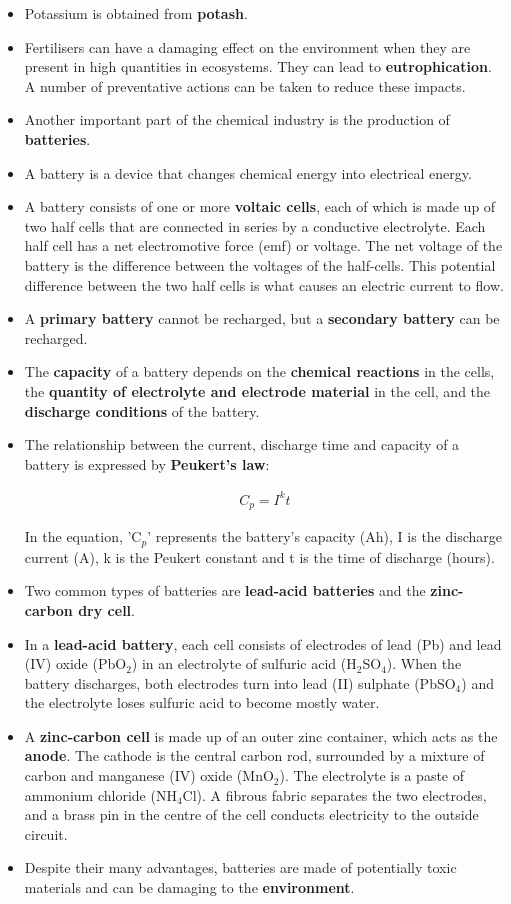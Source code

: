 \begin{itemize}
\item{Potassium is obtained from \textbf{potash}.}
\item{Fertilisers can have a damaging effect on the environment when they are present in high quantities in ecosystems. They can lead to \textbf{eutrophication}. A number of preventative actions can be taken to reduce these impacts.}
\item{Another important part of the chemical industry is the production of \textbf{batteries}.}
\item{A battery is a device that changes chemical energy into electrical energy.}
\item{A battery consists of one or more \textbf{voltaic cells}, each of which is made up of two half cells that are connected in series by a conductive electrolyte. Each half cell has a net electromotive force (emf) or voltage. The net voltage of the battery is the difference between the voltages of the half-cells. This potential difference between the two half cells is what causes an electric current to flow. }
\item{A \textbf{primary battery} cannot be recharged, but a \textbf{secondary battery} can be recharged.}
\item{The \textbf{capacity} of a battery depends on the \textbf{chemical reactions} in the cells, the \textbf{quantity of electrolyte and electrode material} in the cell, and the \textbf{discharge conditions} of the battery.}
\item{The relationship between the current, discharge time and capacity of a battery is expressed by \textbf{Peukert's law}:

\begin{eqnarray*}
C_{p} = I^{k}t
\end{eqnarray*}

In the equation, 'C$_{p}$' represents the battery's capacity (Ah), I is the discharge current (A), k is the Peukert constant and t is the time of discharge (hours).}
\item{Two common types of batteries are \textbf{lead-acid batteries} and the \textbf{zinc-carbon dry cell}.}
\item{In a \textbf{lead-acid battery}, each cell consists of electrodes of lead (Pb) and lead (IV) oxide (PbO$_{2}$) in an electrolyte of sulfuric acid (H$_{2}$SO$_{4}$). When the battery discharges, both electrodes turn into lead (II) sulphate (PbSO$_{4}$) and the electrolyte loses sulfuric acid to become mostly water.}
\item{A \textbf{zinc-carbon cell} is made up of an outer zinc container, which acts as the \textbf{anode}. The cathode is the central carbon rod, surrounded by a mixture of carbon and manganese (IV) oxide (MnO$_{2}$). The electrolyte is a paste of ammonium chloride (NH$_{4}$Cl). A fibrous fabric separates the two electrodes, and a brass pin in the centre of the cell conducts electricity to the outside circuit. }
\item{Despite their many advantages, batteries are made of potentially toxic materials and can be damaging to the \textbf{environment}.}
\end{itemize}

